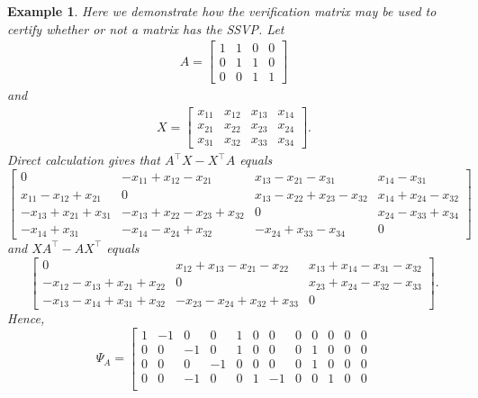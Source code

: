 \documentclass[preprint,12pt]{elsarticle}
\newcommand{\trans  }{^\top}
\newtheorem{Example}[theorem]{Example}
\begin{document}
\begin{Example}
\rm 
Here we  demonstrate how the verification matrix may be used to certify whether or not a matrix has the SSVP.
    Let 
    \begin{align*}
        A = \begin{bmatrix}
            1 & 1 & 0 & 0\\
            0 & 1 & 1 & 0\\
            0 & 0 & 1 & 1
        \end{bmatrix}
    \end{align*}
and
\begin{align*}
    X = \begin{bmatrix}
        x_{11} &x_{12}&x_{13}&x_{14}\\
        x_{21} & x_{22} & x_{23} & x_{24} \\ 
        x_{31} & x_{32} & x_{33} & x_{34}
    \end{bmatrix}.
\end{align*}
Direct calculation gives that $A\trans X-X\trans A$ equals
{\small
\[
 \left[\begin{array}{cccc}
0 & -x_{11} + x_{12} - x_{21} & x_{13} - x_{21} - x_{31} & x_{14} - x_{31} \\
x_{11} - x_{12} + x_{21} & 0 & x_{13} - x_{22} + x_{23} - x_{32} & x_{14} + x_{24} - x_{32} \\
-x_{13} + x_{21} + x_{31} & -x_{13} + x_{22} - x_{23} + x_{32} & 0 & x_{24} - x_{33} + x_{34} \\
-x_{14} + x_{31} & -x_{14} - x_{24} + x_{32} & -x_{24} + x_{33} - x_{34} & 0
\end{array}\right] 
\]}
and  $XA\trans-AX\trans$ equals 
{\small
\[
\left[\begin{array}{ccc}
0 & x_{12} + x_{13} - x_{21} - x_{22} & x_{13} + x_{14} - x_{31} - x_{32} \\
-x_{12} - x_{13} + x_{21} + x_{22} & 0 & x_{23} + x_{24} - x_{32} - x_{33} \\
-x_{13} - x_{14} + x_{31} + x_{32} & -x_{23} - x_{24} + x_{32} + x_{33} & 0
\end{array}\right].
\]
}
Hence,
{\small \[
\Psi_A= \left[\begin{array}{rrrrrrrrrrrr}
1 & -1 & 0 & 0 & 1 & 0 & 0 & 0 & 0 & 0 & 0 & 0 \\
0 & 0 & -1 & 0 & 1 & 0 & 0 & 0 & 1 & 0 & 0 & 0 \\
0 & 0 & 0 & -1 & 0 & 0 & 0 & 0 & 1 & 0 & 0 & 0 \\
0 & 0 & -1 & 0 & 0 & 1 & -1 & 0 & 0 & 1 & 0 & 0 \\

\end{array}\]}
\end{Example}
\end{document}
